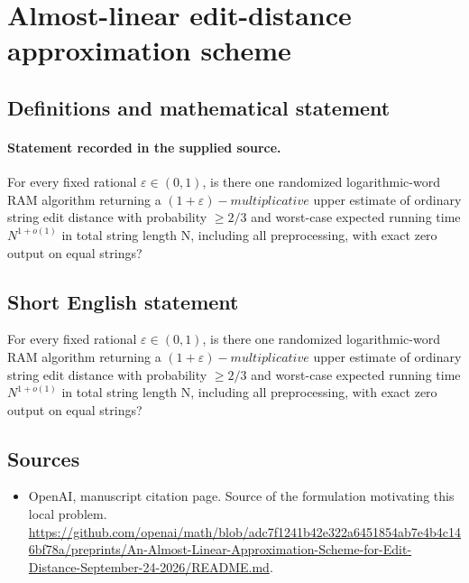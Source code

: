 \documentclass[11pt]{article}
\begin{document}
\section*{Almost-linear edit-distance approximation scheme}\label{30007453}
\subsection{Definitions and mathematical statement}
\paragraph{Statement recorded in the supplied source.}
For every fixed rational $\varepsilon \in (0,1)$, is there one randomized logarithmic-word RAM algorithm returning a $(1+\varepsilon )-multiplicative$ upper estimate of ordinary string edit distance with probability $\geq 2/3$ and worst-case expected running time $N^{1+o(1)}$ in total string length N, including all preprocessing, with exact zero output on equal strings?
\subsection{Short English statement}
For every fixed rational $\varepsilon \in (0,1)$, is there one randomized logarithmic-word RAM algorithm returning a $(1+\varepsilon )-multiplicative$ upper estimate of ordinary string edit distance with probability $\geq 2/3$ and worst-case expected running time $N^{1+o(1)}$ in total string length N, including all preprocessing, with exact zero output on equal strings?
\subsection{Sources}
\begin{itemize}
\item[S1] OpenAI, manuscript citation page. Source of the formulation motivating this local problem.
\url{https://github.com/openai/math/blob/adc7f1241b42e322a6451854ab7e4b4c146bf78a/preprints/An-Almost-Linear-Approximation-Scheme-for-Edit-Distance-September-24-2026/README.md}.
\end{itemize}
\end{document}
